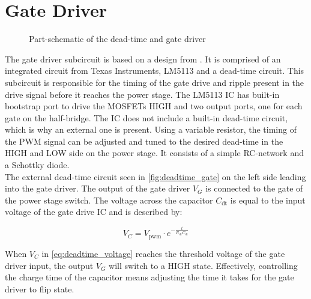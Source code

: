 \section{Gate Driver}
\begin{figure}[H]
	\centering
	\begin{circuitikz}
		
	\end{circuitikz}
	\caption{Part-schematic of the dead-time and gate driver}
	\label{fig:deadtime_gate}
\end{figure}

The gate driver subcircuit is based on a design from \cite{nagy_special_course}. It is comprised of an integrated circuit from Texas Instruments, LM5113 \cite{lm5113} and a dead-time circuit.
This subcircuit is responsible for the timing of the gate drive and ripple present in the drive signal before it reaches the power stage. The LM5113 IC has built-in bootstrap port to drive the MOSFETs HIGH \cite{onsemi_boostrap} and two output ports, one for each gate on the half-bridge. The IC does not include a built-in dead-time circuit, which is why an external one is present. Using a variable resistor, the timing of the PWM signal can be adjusted and tuned to the desired dead-time in the HIGH and LOW side on the power stage. It consists of a simple RC-network and a Schottky diode. \\
The external dead-time circuit seen in \autoref{fig:deadtime_gate} on the left side leading into the gate driver. The output of the gate driver $V_{G}$ is connected to the gate of the power stage switch. The voltage across the capacitor $C_{\mathrm{dt}}$ is equal to the input voltage of the gate drive IC and is described by:

\begin{equation} \label{eq:deadtime_voltage}
	V_{C} = V_{\mathrm{pwm}} \cdot e^{-\frac{t}{R_{\mathrm{dt}} C_{\mathrm{dt}}}}
\end{equation}

When $V_{C}$ in \autoref{eq:deadtime_voltage} reaches the threshold voltage of the gate driver input, the output $V_{G}$ will switch to a HIGH state. Effectively, controlling the charge time of the capacitor means adjusting the time it takes for the gate driver to flip state. 

